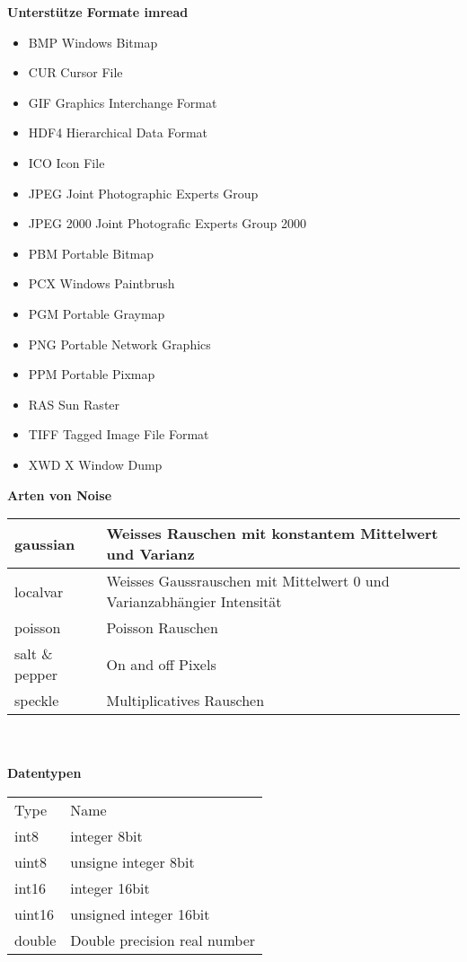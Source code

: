 \hfill
\begin{minipage}{0.4\textwidth}
\textbf{Unterstütze Formate imread}
\begin{itemize}
\item BMP Windows Bitmap
\item CUR Cursor File
\item GIF Graphics Interchange Format
\item HDF4 Hierarchical Data Format
\item ICO Icon File
\item JPEG Joint Photographic Experts Group
\item JPEG 2000 Joint Photografic Experts Group 2000
\item PBM Portable Bitmap
\item PCX Windows Paintbrush
\item PGM Portable Graymap
\item PNG Portable Network Graphics
\item PPM Portable Pixmap
\item RAS Sun Raster
\item TIFF Tagged Image File Format
\item XWD X Window Dump
\end{itemize}
\textbf{Arten von Noise} \\ 
\begin{tabular}{p{2cm}|p{4cm}}
\hline
gaussian & Weisses Rauschen mit konstantem Mittelwert und Varianz \\ \hline
localvar & Weisses Gaussrauschen mit Mittelwert 0 und Varianzabhängier Intensität \\ \hline
poisson & Poisson Rauschen \\ \hline
salt \& pepper & On and off Pixels \\ \hline
speckle & Multiplicatives Rauschen\\ \hline
\end{tabular}
\\ 
\\
\textbf{Datentypen}

\begin{tabular}{p{2cm}|p{4cm}}
\hline
Type & Name \\
int8 & integer 8bit \\
uint8 & unsigne integer 8bit \\
int16 & integer 16bit \\
uint16 & unsigned integer 16bit\\
double & Double precision real number \\ \hline
\end{tabular}

\end{minipage}